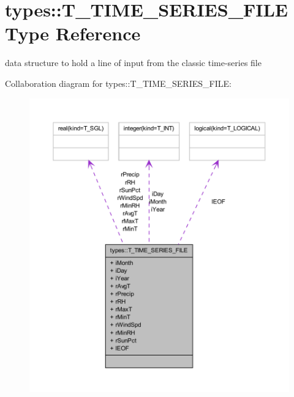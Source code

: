 \hypertarget{typetypes_1_1_t___t_i_m_e___s_e_r_i_e_s___f_i_l_e}{
\section{types::T\_\-TIME\_\-SERIES\_\-FILE Type Reference}
\label{typetypes_1_1_t___t_i_m_e___s_e_r_i_e_s___f_i_l_e}
}


data structure to hold a line of input from the classic time-\/series file  




Collaboration diagram for types::T\_\-TIME\_\-SERIES\_\-FILE:\nopagebreak
\begin{figure}[H]
\begin{center}
\leavevmode
\includegraphics[width=400pt]{typetypes_1_1_t___t_i_m_e___s_e_r_i_e_s___f_i_l_e__coll__graph}
\end{center}
\end{figure}
